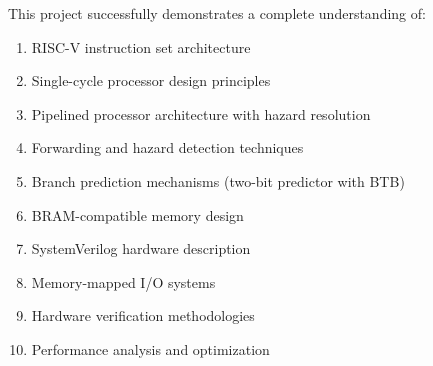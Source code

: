 This project successfully demonstrates a complete understanding of:

\begin{enumerate}
    \item RISC-V instruction set architecture
    \item Single-cycle processor design principles
    \item Pipelined processor architecture with hazard resolution
    \item Forwarding and hazard detection techniques
    \item Branch prediction mechanisms (two-bit predictor with BTB)
    \item BRAM-compatible memory design
    \item SystemVerilog hardware description
    \item Memory-mapped I/O systems
    \item Hardware verification methodologies
    \item Performance analysis and optimization
\end{enumerate}


